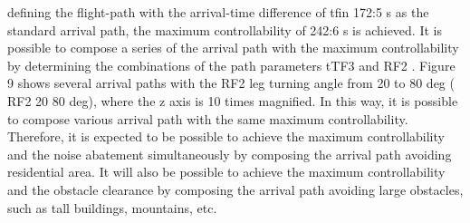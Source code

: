 \documentclass{aer1315-pretty}
\begin{document}
\begin{itemize}
deﬁning the ﬂight-path with the arrival-time difference of tfin
  172:5 s as the standard arrival path, the maximum controllability of
  242:6 s is achieved.
   It is possible to compose a series of the arrival path with the
maximum controllability by determining the combinations of the
path parameters tTF3 and       RF2 . Figure 9 shows several arrival paths
with the RF2 leg turning angle from 20 to 80 deg (                  RF2
20 80 deg), where the z axis is 10 times magniﬁed. In this way, it is
possible to compose various arrival path with the same maximum
controllability. Therefore, it is expected to be possible to achieve the
maximum controllability and the noise abatement simultaneously by
composing the arrival path avoiding residential area. It will also be
possible to achieve the maximum controllability and the obstacle
clearance by composing the arrival path avoiding large obstacles,
such as tall buildings, mountains, etc.



\end{itemize}
\end{document}

